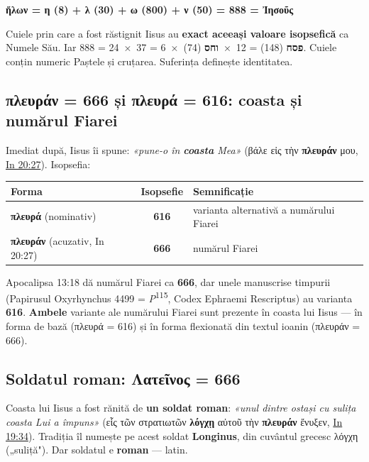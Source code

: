 \documentclass[12pt,a4paper,twoside,openany]{book}
\begin{document}
\begin{center}
\textbf{ἥλων = η (8) + λ (30) + ω (800) + ν (50) = 888 = Ἰησοῦς}
\end{center}

Cuiele prin care a fost răstignit Iisus au \textbf{exact aceeași valoare isopsefică} ca Numele Său. Iar 888 = 24~×~37 = 6~×~\textbf{פסח} (148) = 12~×~\textbf{וחס} (74). Cuiele conțin numeric Paștele și cruțarea. Suferința definește identitatea.

\subsection{πλευράν = 666 și πλευρά = 616: coasta și numărul Fiarei}

Imediat după, Iisus îi spune: \textit{«pune-o în \textbf{coasta} Mea»} (βάλε εἰς τὴν \textbf{πλευράν} μου, \href{https://bibliaortodoxa.ro/carte.php?id=35\&cap=20\#27}{In 20:27}). Isopsefia:

\begin{center}
\small
\begin{tabular}{lcl}
\toprule
\textbf{Forma} & \textbf{Isopsefie} & \textbf{Semnificație} \\
\midrule
\textbf{πλευρά} (nominativ) & \textbf{616} & varianta alternativă a numărului Fiarei \\
\textbf{πλευράν} (acuzativ, In 20:27) & \textbf{666} & numărul Fiarei \parencite{bauckham1993} \\
\bottomrule
\end{tabular}
\end{center}

Apocalipsa 13:18 dă numărul Fiarei ca \textbf{666}, dar unele manuscrise timpurii (Papirusul Oxyrhynchus 4499 = \textit{P}\textsuperscript{115}, Codex Ephraemi Rescriptus) au varianta \textbf{616}. \textbf{Ambele} variante ale numărului Fiarei sunt prezente în coasta lui Iisus --- în forma de bază (πλευρά = 616) și în forma flexionată din textul ioanin (πλευράν = 666).

\subsection{Soldatul roman: Λατεῖνος = 666}

Coasta lui Iisus a fost rănită de \textbf{un soldat roman}: \textit{«unul dintre ostași cu sulița coasta Lui a împuns»} (εἷς τῶν στρατιωτῶν \textbf{λόγχῃ} αὐτοῦ τὴν \textbf{πλευράν} ἔνυξεν, \href{https://bibliaortodoxa.ro/carte.php?id=35\&cap=19\#34}{In 19:34}). Tradiția îl numește pe acest soldat \textbf{Longinus}, din cuvântul grecesc λόγχη („suliță"). Dar soldatul e \textbf{roman} --- latin.
\end{document}
